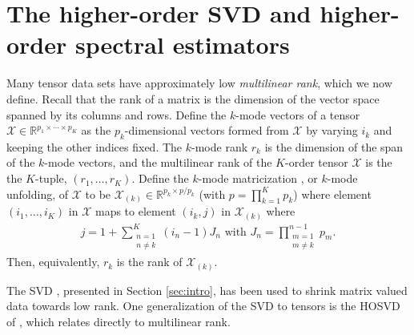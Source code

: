 \section{The higher-order SVD and higher-order spectral estimators}
\label{sec:tensor}

Many tensor data sets have approximately low \emph{multilinear rank}, which we now define. Recall that the rank of a matrix is the dimension of the vector space spanned by its columns and rows. Define the $k$-mode vectors of a tensor $\mathcal{X} \in \mathbb{R}^{p_1\times\cdots\times p_K}$ as the $p_k$-dimensional vectors formed from $\mathcal{X}$ by varying $i_k$ and keeping the other indices fixed. The $k$-mode rank $r_k$ is the dimension of the span of the $k$-mode vectors, and the multilinear rank of the $K$-order tensor $\mathcal{X}$ is the the $K$-tuple, $(r_1,\ldots,r_K)$. Define the $k$-mode matricization \citep{kolda2009tensor}, or $k$-mode unfolding, of $\mathcal{X}$ to be $\mathcal{X}_{(k)}\in \mathbb{R}^{p_k \times p/p_k}$ (with $p = \prod_{k=1}^Kp_k$) where element $(i_1,\ldots,i_K)$ in $\mathcal{X}$ maps to element $(i_k,j)$ in $\mathcal{X}_{(k)}$ where
\begin{align*}
j = 1 + \sum_{\substack{n = 1 \\ n\neq k}}^{K}(i_n - 1)J_n \text{ with } J_n = \prod_{\substack{ m = 1 \\ m \neq k}}^{n-1}p_m.
\end{align*}
Then, equivalently, $r_k$ is the rank of $\mathcal{X}_{(k)}$.

The SVD , presented in Section \ref{sec:intro}, has been used to shrink matrix valued data towards low rank. One generalization of the SVD to tensors is the HOSVD of \cite{de2000multilinear}, which relates directly to multilinear rank.


